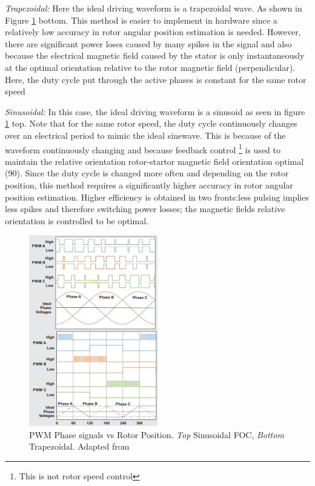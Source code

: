 \textit{Trapezoidal:}
Here the ideal driving waveform is a trapezoidal wave. As shown in Figure \ref{fig:foc_trapezoidal_signals} bottom. This method is easier to implement in hardware since a relatively low accuracy in rotor angular position estimation is needed. However, there are significant power loses caused by many spikes in the signal and also because the electrical magnetic field caused by the stator is only instantaneously at the optimal orientation relative to the rotor magnetic field (perpendicular). Here, the duty cycle put through the active phases is constant for the same rotor speed
\newline

\textit{Sinusoidal:}
In this case, the ideal driving waveform is a sinusoid as seen in figure \ref{fig:foc_trapezoidal_signals} top. Note that for the same rotor speed, the duty cycle continuously changes over an electrical period to mimic the ideal sinewave. This is because of the waveform continuously changing and because feedback control \footnote{This is not rotor speed control} is used to maintain the relative orientation rotor-startor magnetic field orientation optimal (90\textdegree). Since the duty cycle is changed more often and depending on the rotor position, this method requires a significantly higher accuracy in rotor angular position estimation.
Higher efficiency is obtained in two fronts:less pulsing implies less spikes and therefore switching power losses; the magnetic fields relative orientation is controlled to be optimal. 

\begin{figure}
    \centering
    \includegraphics[width=0.5\textwidth]{images/foc_trap_sig.png}
    \caption{PWM Phase signals vs Rotor Position. \textit{Top} Sinusoidal FOC, \textit{Bottom} Trapezoidal. Adapted from \cite{Mogensen_ESC_Motor_Control2016}}
    \label{fig:foc_trapezoidal_signals}
\end{figure}


